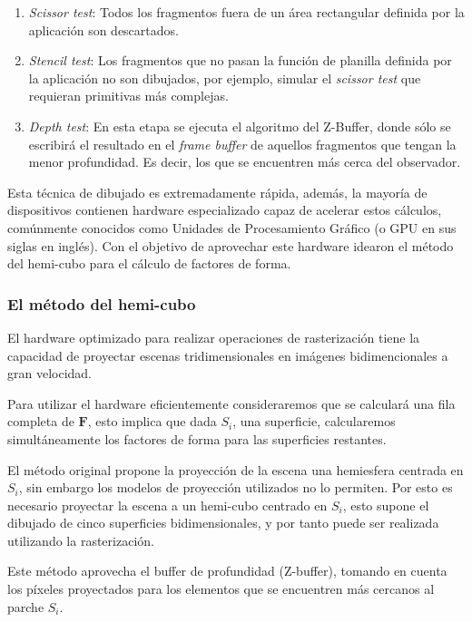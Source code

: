 \begin{enumerate}
\begin{enumerate}
			\item \textit{Scissor test}: Todos los fragmentos fuera de un área rectangular definida por la aplicación son descartados.
			\item \textit{Stencil test}: Los fragmentos que no pasan la función de planilla definida por la aplicación no son dibujados, por ejemplo, simular el \textit{scissor test} que requieran primitivas más complejas.
			\item \textit{Depth test}: En esta etapa se ejecuta el algoritmo del Z-Buffer, donde sólo se escribirá el resultado en el \textit{frame buffer} de aquellos fragmentos que tengan la menor profundidad. Es decir, los que se encuentren más cerca del observador.
		\end{enumerate}
\end{enumerate}

Esta técnica de dibujado es extremadamente rápida, además, la mayoría de dispositivos contienen hardware especializado capaz de acelerar estos cálculos, comúnmente conocidos como Unidades de Procesamiento Gráfico (o GPU en sus siglas en inglés). Con el objetivo de aprovechar este hardware \citeauthor{Cohen} idearon el método del hemi-cubo para el cálculo de factores de forma.

\subsubsection{El método del hemi-cubo}

El hardware optimizado para realizar operaciones de rasterización tiene la capacidad de proyectar escenas tridimensionales en imágenes bidimencionales a gran velocidad.

Para utilizar el hardware eficientemente consideraremos que se calculará una fila completa de $\mathbf{F}$, esto implica que dada $S_{i}$, una superficie, calcularemos simultáneamente los factores de forma para las superficies restantes. 

El método original propone la proyección de la escena una hemiesfera centrada en $S_{i}$, sin embargo los modelos de proyección utilizados no lo permiten. Por esto es necesario proyectar la escena a un hemi-cubo centrado en $S_{i}$, esto supone el dibujado de cinco superficies bidimensionales, y por tanto puede ser realizada utilizando la rasterización.

Este método aprovecha el buffer de profundidad (Z-buffer), tomando en cuenta los píxeles proyectados para los elementos que se encuentren más cercanos al parche $S_{i}$.


